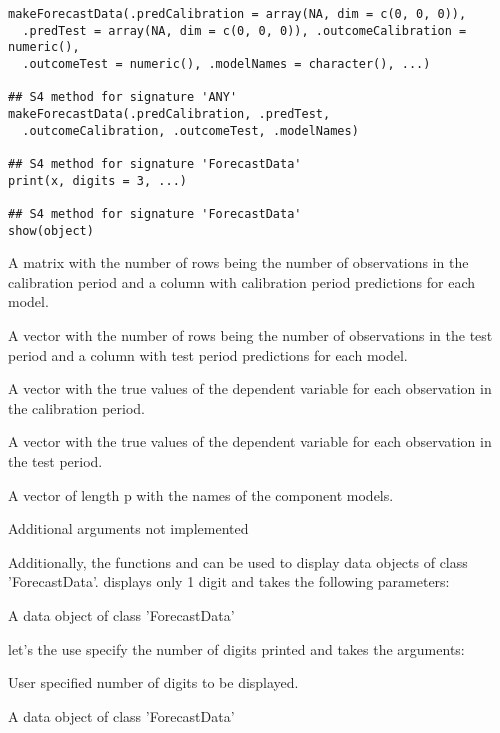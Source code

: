 \documentclass[a4paper]{book}
\begin{document}
%
\begin{Usage}
\begin{verbatim}
makeForecastData(.predCalibration = array(NA, dim = c(0, 0, 0)),
  .predTest = array(NA, dim = c(0, 0, 0)), .outcomeCalibration = numeric(),
  .outcomeTest = numeric(), .modelNames = character(), ...)

## S4 method for signature 'ANY'
makeForecastData(.predCalibration, .predTest,
  .outcomeCalibration, .outcomeTest, .modelNames)

## S4 method for signature 'ForecastData'
print(x, digits = 3, ...)

## S4 method for signature 'ForecastData'
show(object)
\end{verbatim}
\end{Usage}
%
\begin{Arguments}
\begin{ldescription}
\item[\code{.predCalibration}] A matrix with the number of rows being the number of observations in the calibration period and a column with calibration period predictions for each model.

\item[\code{.predTest}] A vector with the number of rows being the number of observations in the test period and a column with test period predictions for each model.

\item[\code{.outcomeCalibration}] A vector with the true values of the dependent variable for each observation in the calibration period.

\item[\code{.outcomeTest}] A vector with the true values of the dependent variable for each observation in the test period.

\item[\code{.modelNames}] A vector of length p with the names of the component models.

\item[\code{...}] Additional arguments not implemented

Additionally, the functions  and  can be used to display data objects of class 'ForecastData'.
 displays only 1 digit and takes the following parameters:

\item[\code{x}] A data object of class 'ForecastData'

 let's the use specify the number of digits printed and takes the arguments:

\item[\code{digits}] User specified number of digits to be displayed.

\item[\code{object}] A data object of class 'ForecastData'
\end{ldescription}
\end{Arguments}
\end{document}
